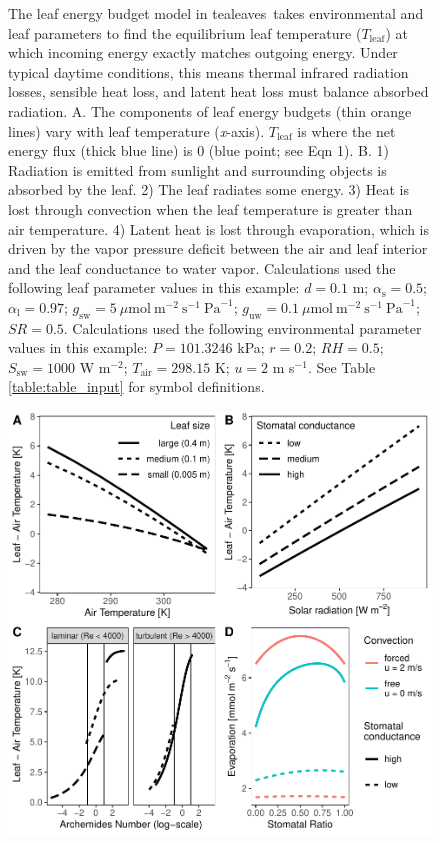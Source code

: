 \documentclass[11pt, oneside]{article}
\newcommand{\pkg}[1]{{\fontseries{b}\selectfont #1}}
\newcommand{\tealeaves}{\pkg{tealeaves}}
\begin{document}
\begin{figure}[t!]
\caption{The leaf energy budget model in \tealeaves~takes environmental and leaf parameters to find the equilibrium leaf temperature ($T_\mathrm{leaf}$) at which incoming energy exactly matches outgoing energy. Under typical daytime conditions, this means thermal infrared radiation losses, sensible heat loss, and latent heat loss must balance absorbed radiation. A. The components of leaf energy budgets (thin orange lines) vary with leaf temperature (\textit{x}-axis). $T_\mathrm{leaf}$ is where the net energy flux (thick blue line) is 0 (blue point; see Eqn 1). B. 1) Radiation is emitted from sunlight and surrounding objects is absorbed by the leaf. 2) The leaf radiates some energy. 3) Heat is lost through convection when the leaf temperature is greater than air temperature. 4) Latent heat is lost through evaporation, which is driven by the vapor pressure deficit between the air and leaf interior and the leaf conductance to water vapor. Calculations used the following leaf parameter values in this example: $d = 0.1$ m; $\alpha_\mathrm{s} = 0.5$; $\alpha_\mathrm{l} = 0.97$; $g_\mathrm{sw} = 5~\mu \textrm{mol}~\textrm{m} ^ {-2}~\textrm{s} ^ {-1}~\textrm{Pa} ^ {-1}$; $g_\mathrm{uw} = 0.1~\mu \textrm{mol}~\textrm{m} ^ {-2}~\textrm{s} ^ {-1}~\textrm{Pa} ^ {-1}$; $\mathit{SR} = 0.5$. Calculations used the following environmental parameter values in this example: $P = 101.3246$ kPa; $r = 0.2$; $\mathit{RH} = 0.5$; $S_\mathrm{sw} = 1000$ W m$^{-2}$; $T_\mathrm{air} = 298.15$ K; $u = 2$ m s$^{-1}$. See Table \ref{table:table_input} for symbol definitions.}
\label{fig:fig1}
\end{figure}

\clearpage

\begin{figure}[ht]
\centerline{\includegraphics[width=\textwidth,height=\textwidth]{../figures/fig2.pdf}}
\end{figure}
\end{document}
